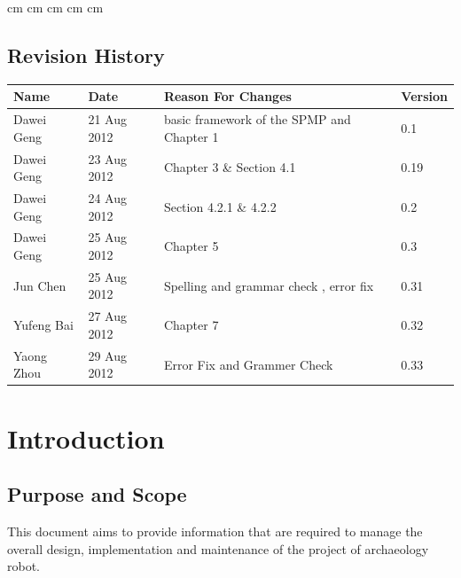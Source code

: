 \documentclass[11pt, a4paper]{report}
\begin{document}
 cm
 cm
 cm
 cm
 cm

\tableofcontents






\clearpage
\section*{Revision History}
\begin{tabular}{| l | l | l | l | }
\hline
Name      		&	Date        	&	Reason For Changes						&	Version		\\ \hline
Dawei Geng      &	21 Aug 2012    	&	basic framework of the SPMP and Chapter 1		&	0.1			\\ \hline
Dawei Geng      &	23 Aug 2012    	&	Chapter 3 \& Section 4.1					&	0.19			\\ \hline
Dawei Geng      &	24 Aug 2012     &	Section 4.2.1 \& 4.2.2					&	0.2			\\ \hline
Dawei Geng     	&	25 Aug 2012     &	Chapter 5								&	0.3			\\ \hline
Jun Chen		&	25 Aug 2012	&	Spelling and grammar check , error fix		&	0.31			\\ \hline
Yufeng Bai      &	27 Aug 2012	&	Chapter 7								&	0.32			\\ \hline
Yaong Zhou		&	29 Aug 2012	&	Error Fix and Grammer Check				&	0.33			\\ \hline



\end{tabular}
\clearpage


\chapter{Introduction}

\section{Purpose and Scope}
This document aims to provide information that are required to manage the overall design, implementation and maintenance of the project of archaeology robot. 
\end{document}
